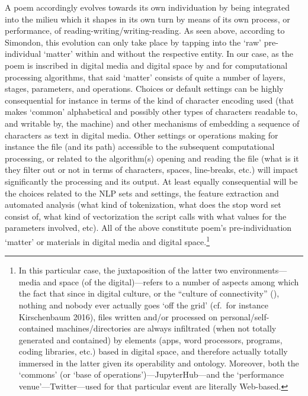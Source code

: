 A poem accordingly evolves towards its own individuation by being
integrated into the milieu which it shapes in its own turn by means of
its own process, or performance, of reading-writing/writing-reading. As
seen above, according to Simondon, this evolution can only take place by
tapping into the `raw' pre-individual `matter' within and without the
respective entity. In our case, as the poem is inscribed in digital
media and digital space by and for computational processing algorithms,
that said `matter' consists of quite a number of layers, stages,
parameters, and operations. Choices or default settings can be highly
consequential for instance in terms of the kind of character encoding
used (that makes `common' alphabetical and possibly other types of
characters readable to, and writable by, the machine) and other
mechanisms of embedding a sequence of characters as text in digital
media. Other settings or operations making for instance the file (and
its path) accessible to the subsequent computational processing, or
related to the algorithm(s) opening and reading the file (what is it
they filter out or not in terms of characters, spaces, line-breaks,
etc.) will impact significantly the processing and its output. At least
equally consequential will be the choices related to the NLP sets and
settings, the feature extraction and automated analysis (what kind of
tokenization, what does the stop word set consist of, what kind of
vectorization the script calls with what values for the parameters
involved, etc). All of the above constitute poem's pre-individuation
`matter' or materials in digital media and digital space.\footnote{In
  this particular case, the juxtaposition of the latter two
  environments---media and space (of the digital)---refers to a number
  of aspects among which the fact that since in digital culture, or the
  ``culture of connectivity'' (\cite{van2013culture}), nothing and
  nobody ever actually goes `off the grid' (cf.~for instance
  Kirschenbaum 2016), files written and/or processed on
  personal/self-contained machines/directories are always infiltrated
  (when not totally generated and contained) by elements (apps, word
  processors, programs, coding libraries, etc.) based in digital space,
  and therefore actually totally immersed in the latter given its
  operability and ontology. Moreover, both the `commons' (or `base of
  operations')---JupyterHub---and the `performance
  venue'---Twitter---used for that particular event are literally
  Web-based.}


